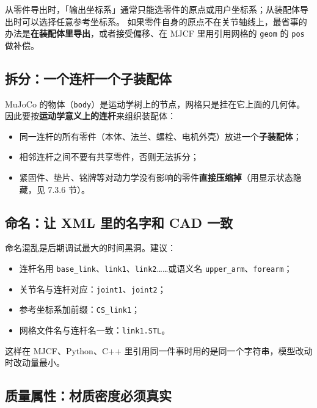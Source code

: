 \begin{tipbox}[装配体 vs 零件]
	从零件导出时，「输出坐标系」通常只能选零件的原点或用户坐标系；从装配体导出时可以选择任意参考坐标系。
	如果零件自身的原点不在关节轴线上，最省事的办法是\textbf{在装配体里导出}，或者接受偏移、在 MJCF 里用引用网格的 \texttt{geom} 的 \texttt{pos} 做补偿。
\end{tipbox}

\subsection{拆分：一个连杆一个子装配体}

MuJoCo 的物体（\texttt{body}）是运动学树上的节点，网格只是挂在它上面的几何体。因此要按\textbf{运动学意义上的连杆}来组织装配体：

\begin{itemize}
	\item 同一连杆的所有零件（本体、法兰、螺栓、电机外壳）放进一个\textbf{子装配体}；
	\item 相邻连杆之间不要有共享零件，否则无法拆分；
	\item 紧固件、垫片、铭牌等对动力学没有影响的零件\textbf{直接压缩掉}（用显示状态隐藏，见 7.3.6 节）。
\end{itemize}

\subsection{命名：让 XML 里的名字和 CAD 一致}

命名混乱是后期调试最大的时间黑洞。建议：

\begin{itemize}
	\item 连杆名用 \texttt{base\_link}、\texttt{link1}、\texttt{link2}……或语义名 \texttt{upper\_arm}、\texttt{forearm}；
	\item 关节名与连杆对应：\texttt{joint1}、\texttt{joint2}；
	\item 参考坐标系加前缀：\texttt{CS\_link1}；
	\item 网格文件名与连杆名一致：\texttt{link1.STL}。
\end{itemize}

这样在 MJCF、Python、C++ 里引用同一件事时用的是同一个字符串，模型改动时改动量最小。

\subsection{质量属性：材质密度必须真实}

